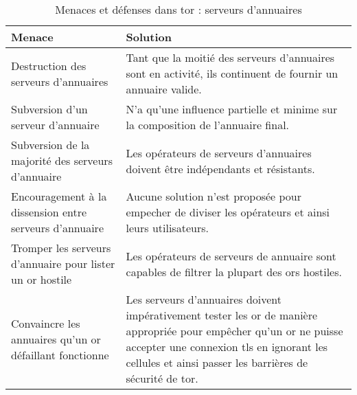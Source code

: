 \begin{table}[htpb]
    \centering
    \begin{tabularx}{\textwidth}{
        >{\raggedright\arraybackslash}p{4.5cm}
        >{\raggedright\arraybackslash}X}
    \toprule
    \rowcolor[HTML]{EFEFEF}
    \textbf{Menace}                                                         & \textbf{Solution} \\ 
    \midrule
    Destruction des serveurs d'annuaires                                    & Tant que la moitié des serveurs d'annuaires sont en activité, ils continuent de fournir un annuaire valide. \\
    \midrule
    Subversion d'un serveur d'annuaire                                      & N'a qu'une influence partielle et minime sur la composition de l'annuaire final. \\
    \midrule
    Subversion de la majorité des serveurs d'annuaire                       & Les opérateurs de serveurs d'annuaires doivent être indépendants et résistants. \\
    \midrule
    Encouragement à la dissension entre serveurs d'annuaire                 & Aucune solution n'est proposée pour empecher de diviser les opérateurs et ainsi leurs utilisateurs. \\
    \midrule
    Tromper les serveurs d'annuaire pour lister un \acrshort{or} hostile    & Les opérateurs de serveurs de annuaire sont capables de filtrer la plupart des \acrshort{or}s hostiles. \\
    \midrule
    Convaincre les annuaires qu'un \acrshort{or} défaillant fonctionne      & Les serveurs d'annuaires doivent impérativement tester les \acrshort{or} de manière appropriée pour empêcher qu'un \acrshort{or} ne puisse accepter une connexion \acrshort{tls} en ignorant les cellules et ainsi passer les barrières de sécurité de \acrshort{tor}. \\
    \bottomrule
    \end{tabularx}
    \caption{Menaces et défenses dans \acrshort{tor} : serveurs d'annuaires}
    \label{tab:ad-ds}
\end{table}
